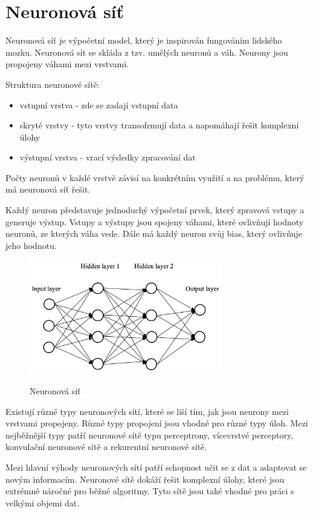 \section{Neuronová síť}
Neuronová síť je výpočetní model, který je inspirován fungováním lidského mozku.
Neuronová sít se skláda z tzv. umělých neuronů a váh.
Neurony jsou propojeny váhami mezi vrstvami.

Struktura neuronové sítě:
\begin{itemize}
    \item vstupní vrstva - zde se zadají vstupní data
    \item skryté vrstvy - tyto vrstvy transofrmují data a napomáhají řešit komplexní úlohy
    \item výstupní vrstva - vrací výsledky zpracování dat
\end{itemize}

Počty neuronů v každé vrstvě závisí na konkrétním využití a na problému, který má neuronová síť řešit.

Každý neuron představuje jednoduchý výpočetní prvek, který zpravová vstupy a generuje výstup.
Vstupy a výstupy jsou spojeny váhami, které ovlivňují hodnoty neuronů, ze kterých váha vede.
Dále má každý neuron svůj bias, který ovlivňuje jeho hodnotu.

\begin{figure}[h]
    \centering
    \includegraphics[width=0.75\textwidth]{images/network.png}
    \caption{Neuronová síť}\cite{sit}
\end{figure}

Existují různé typy neuronových sítí, které se liší tím, jak jsou neurony mezi vrstvami propojeny.
Různé typy propojení jsou vhodné pro různé typy úloh.
Mezi nejběžnější typy patří neuronové sítě typu perceptrony, vícevrstvé perceptory, konvulační neuronové sítě a rekurentní neuronové sítě.

Mezi hlavní výhody neuronových sítí patří schopnost učit se z dat a adaptovat se novým informacím.
Neuronové sítě dokáží řešit komplexní úlohy, které jsou extrémně náročné pro běžné algoritmy.
Tyto sítě jsou také vhodné pro práci s velkými objemi dat.

